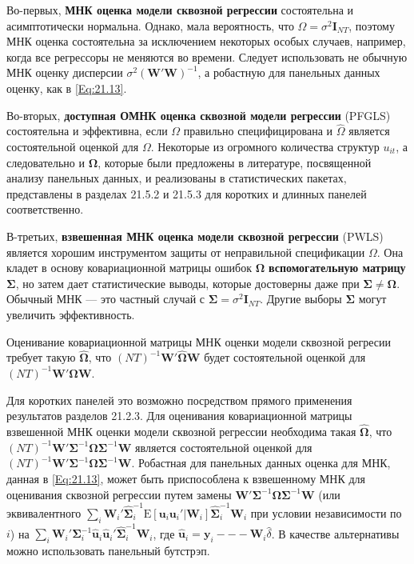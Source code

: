Во-первых, \textbf{МНК оценка модели сквозной регрессии} состоятельна и асимптотически нормальна. Однако, мала вероятность, что $\Omega=\sigma^2 \mathbf I_{NT}$, поэтому МНК оценка состоятельна за исключением некоторых особых случаев, например, когда все регрессоры не меняются во времени.  Следует использовать не обычную МНК оценку дисперсии  $\sigma^2 (\mathbf W' \mathbf W)^{-1}$, а робастную для панельных данных оценку, как в \ref{Eq:21.13}. 

Во-вторых, \textbf{доступная ОМНК оценка сквозной модели регрессии} (PFGLS) состоятельна и эффективна, если $\Omega$ правильно специфицирована и $\hat{\Omega}$ является состоятельной оценкой для $\Omega$. Некоторые из огромного количества структур $u_{it}$, а следовательно и $\bm\Omega$, которые были предложены в литературе, посвященной анализу панельных данных, и реализованы в статистических пакетах, представлены в разделах 21.5.2 и 21.5.3 для коротких и длинных панелей соответственно.

В-третьих, \textbf{взвешенная МНК оценка модели сквозной регрессии} (PWLS) является хорошим инструментом защиты от неправильной спецификации $\Omega$. Она кладет в основу ковариационной матрицы ошибок $\bm\Omega$ \textbf{вспомогательную матрицу $\bm\Sigma$}, но затем дает статистические выводы, которые достоверны даже при $\bm\Sigma \neq \bm\Omega$. Обычный МНК --- это частный случай с $\bm\Sigma = \sigma^2 \mathbf I_{NT}$. Другие выборы $\bm\Sigma$ могут увеличить эффективность.

Оценивание ковариационной матрицы МНК оценки модели сквозной регресии требует такую $\hat{\bm\Omega}$, что $(NT)^{-1} \mathbf W' \hat{\bm\Omega} \mathbf W$ будет состоятельной оценкой для $(NT)^{-1} \mathbf W' \bm\Omega \mathbf W$.

Для коротких панелей это возможно посредством прямого применения результатов разделов 21.2.3. Для оценивания ковариационной матрицы взвешенной МНК оценки модели сквозной регрессии необходима такая $\hat{\bm\Omega}$, что $(NT)^{-1} \mathbf W' \bm\Sigma^{-1} \hat{\bm\Omega}\bm\Sigma^{-1} \mathbf W$ является состоятельной оценкой для $(NT)^{-1} \mathbf W' \bm\Sigma^{-1} \bm\Omega \bm\Sigma^{-1} \mathbf W$. Робастная для панельных данных оценка для МНК, данная в \ref{Eq:21.13}, может быть приспособлена к взвешенному МНК для оценивания сквозной регрессии путем замены $\mathbf W' \bm\Sigma^{-1} \bm\Omega \bm\Sigma^{-1} \mathbf W$ (или эквивалентного $\sum_i \mathbf W_i' \hat{\bm\Sigma}^{-1}_i \mathrm E[\mathbf u_i \mathbf u_i' | \mathbf W_i] \hat{\bm\Sigma}^{-1}_i \mathbf W_i$ при условии независимости по $i$) на  $\sum_i \mathbf W_i' \bm\Sigma^{-1}_i \hat{\mathbf u}_i \hat{\mathbf u}_i'  \hat{\bm\Sigma}^{-1}_i \mathbf W_i$, где $\hat{\mathbf u}_i=\mathbf y_i --- \mathbf W_i \hat{\delta}$. В качестве альтернативы можно использовать панельный бутстрэп.

